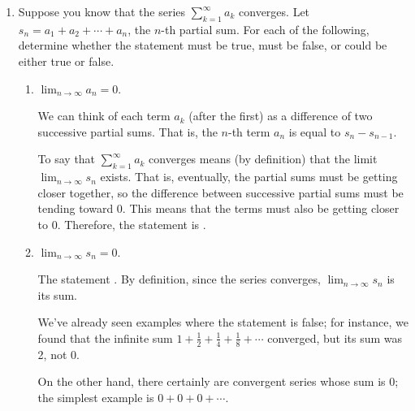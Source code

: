 \documentclass[main]{subfiles}
\begin{document}
 \begin{enumerate}
     

    
    \item 
    Suppose you know that the series $\displaystyle \sum_{k=1}^\infty a_k$
    converges.  Let $s_n = a_1 + a_2 + \cdots + a_n$, the $n$-th partial
    sum.  For each of the following, determine whether the statement must
    be true, must be false, or could be either true or false.
    \begin{enumerate}
      \item \begin{problem}[\vfill]
          $\displaystyle \lim_{n \to \infty} a_n = 0$.
      \end{problem}

      
       \begin{solution}
  We can think of each term $a_k$ (after the first) as a difference of
  two successive partial sums.  That is, the $n$-th term $a_n$ is
  equal to $s_n - s_{n-1}$.

  To say that $\displaystyle \sum_{k=1}^\infty a_k$ converges means
  (by definition) that the limit $\displaystyle \lim_{n \to \infty}
  s_n$ exists.  That is, eventually, the partial sums must be getting
  closer together, so the difference between successive partial sums
  must be tending toward 0.  This means that the terms must also be getting closer to 0. Therefore, the statement is .
  \end{solution}

      \item \begin{problem}[\vfill]
      $\displaystyle \lim_{n \to \infty} s_n = 0$.
      \end{problem}
          
    \begin{solution}
  The statement .  By
  definition, since the series converges, $\displaystyle \lim_{n \to
  \infty} s_n$ is its sum.  

 We've already seen examples where the statement
  is false; for instance, we found that the infinite sum $1+\frac12 +\frac14 +\frac18 +\cdots$
  converged, but its sum was 2, not 0.

  On the other hand, there certainly are convergent series whose sum
  is 0; the simplest example is $0 + 0 + 0 + \cdots$. 
  \end{solution}


\end{enumerate}
\end{enumerate}
\end{document}
